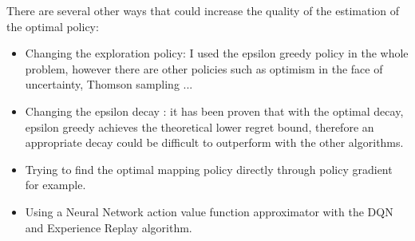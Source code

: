 \documentclass[12pt,a4paper]{article}
\begin{document}
There are several other ways that could increase the quality of the estimation of the optimal policy:
\begin{itemize}
	\item Changing the exploration policy: I used the epsilon greedy policy in the whole problem, however there are other policies such as optimism in the face of uncertainty, Thomson sampling \cite{DBLP:journals/corr/abs-1209-3352} ...
	\item Changing the epsilon decay : it has been proven that with the optimal decay, epsilon greedy achieves the theoretical lower regret bound, therefore an appropriate decay could be difficult to outperform with the other algorithms.
	\item Trying to find the optimal mapping policy directly through policy gradient for example.
	\item Using a Neural Network action value function approximator with the DQN and Experience Replay algorithm.
\end{itemize}

\newpage
\nocite{*}


\end{document}
